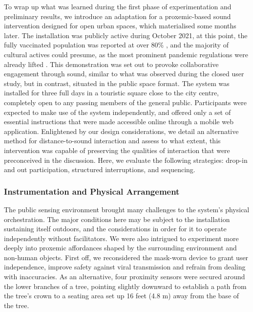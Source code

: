 To wrap up what was learned during the first phase of experimentation and preliminary results, we introduce an adaptation for a proxemic-based sound intervention designed for open urban spaces, which materialised some months later. The installation was publicly active during October 2021, at this point, the fully vaccinated population was reported at over 80\% \cite{ritchie_coronavirus_2020}, and the majority of cultural actives could presume, as the most prominent pandemic regulations were already lifted \cite{direcao-geral_da_saude_dgs_covid-19_2022}. This demonstration was set out to provoke collaborative engagement through sound, similar to what was observed during the closed user study, but in contrast, situated in the public space format. The system was installed for three full days in a touristic square close to the city centre, completely open to any passing members of the general public. Participants were expected to make use of the system independently, and offered only a set of essential instructions that were made accessible online through a mobile web application. Enlightened by our design considerations, we detail an alternative method for distance-to-sound interaction and assess to what extent, this intervention was capable of preserving the qualities of interaction that were preconceived in the discussion. Here, we evaluate the following strategies: drop-in and out participation, structured interruptions, and sequencing.

\subsubsection{Instrumentation and Physical Arrangement}

The public sensing environment brought many challenges to the system's physical orchestration. The major conditions here may be subject to the installation sustaining itself outdoors, and the considerations in order for it to operate independently without facilitators. We were also intrigued to experiment more deeply into proxemic affordances shaped by the surrounding environment and non-human objects. First off, we reconsidered the mask-worn device to grant user independence, improve safety against viral transmission and refrain from dealing with inaccuracies. As an alternative, four proximity sensors were secured around the lower branches of a tree, pointing slightly downward to establish a path from the tree's crown to a seating area set up 16 feet (4.8 m) away from the base of the tree.

